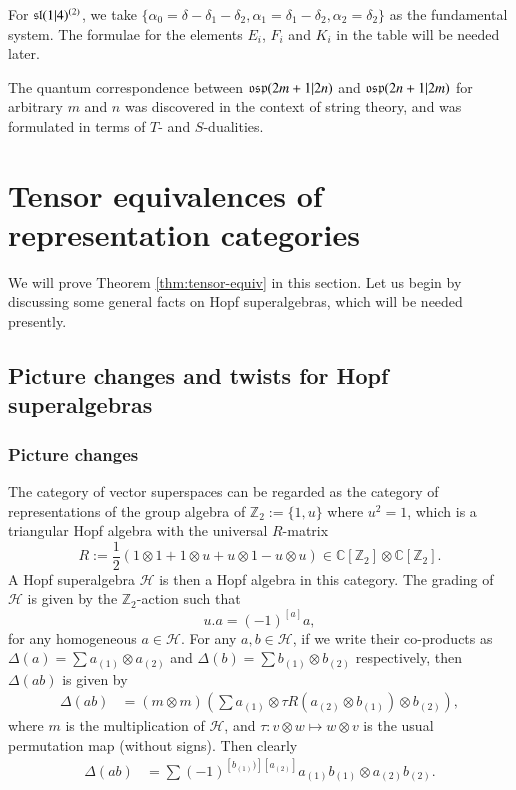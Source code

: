 \documentclass[12pt]{amsart}
\theoremstyle{definition}
\theoremstyle{remark}
\numberwithin{equation}{section}
\begin{document}
For ${{\rm\mathfrak{sl}}}(1|4)^{(2)}$, we take  $\{\alpha_0=\delta-\delta_1-\delta_2,\alpha_1=\delta_1-\delta_2,\alpha_2=\delta_2\}$ as the fundamental system.
The formulae for the elements $E_i$, $F_i$ and $K_i$ in the table will be needed later.

The quantum correspondence between ${{\rm\mathfrak{osp}}}(2m+1|2n)$ and ${{\rm\mathfrak{osp}}}(2n+1|2m)$
for arbitrary $m$ and $n$  was discovered \cite{MW}  in the context of string theory,
and was formulated in terms of $T$- and $S$-dualities.

\section{Tensor equivalences of representation categories}\label{sect:tensor-cats}

We will prove Theorem \ref{thm:tensor-equiv} in this section. Let us begin by discussing some general facts on Hopf superalgebras, which will be needed presently.
\subsection{Picture changes and twists for Hopf superalgebras}\label{sect:Hopf}
\subsubsection{Picture changes}\label{sect:picture}

The category of vector superspaces can be regarded as the category of representations of the group algebra of ${{\mathbb Z}}_2:=\{1, u\}$ where $u^2=1$, which is a triangular Hopf algebra with the universal $R$-matrix
\[
R :=\frac{1}{2}\left(1 \otimes 1 + 1  \otimes u + u  \otimes 1- u  \otimes u\right) \in {{\mathbb C}}[{{\mathbb Z}}_2]  \otimes{{\mathbb C}}[{{\mathbb Z}}_2].
\]
A Hopf superalgebra ${{\mathscr H}}$ is then a Hopf algebra in this category. The grading of ${{\mathscr H}}$ is given by the ${{\mathbb Z}}_2$-action such that
\[
u. a = (-1)^{[a]} a,
\]
for any homogeneous $a\in {{\mathscr H}}$. For any  $a, b\in {{\mathscr H}}$, if we write their co-products as
$\Delta(a) = \sum a_{(1)}\otimes a_{(2)}$ and $\Delta(b) = \sum b_{(1)}\otimes b_{(2)}$ respectively, then $\Delta(a b)$ is given by
\[
\begin{aligned}
\Delta(a b) &= (m\otimes m)\left(\sum a_{(1)}\otimes \tau R(a_{(2)}\otimes b_{(1)})\otimes b_{(2)}\right),
\end{aligned}
\]
where $m$ is the multiplication of ${{\mathscr H}}$, and $\tau: v\otimes w\mapsto w\otimes v$ is the usual permutation map (without signs).  Then clearly
\[
\begin{aligned}
\Delta(a b)
&= \sum (-1)^{[b_{(1)})][a_{(2)}]}a_{(1)}b_{(1)}\otimes a_{(2)}b_{(2)}.
\end{aligned}
\]
\end{document}
